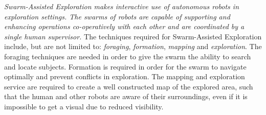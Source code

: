 
  \emph{Swarm-Assisted Exploration makes interactive use of autonomous robots in exploration settings. The swarms of robots are capable of supporting and enhancing operations co-operatively with each other and are coordinated by a single human supervisor.}\cite{Naghsh2008,Penders2011}
    The techniques required for Swarm-Assisted Exploration include, but are not limited to: \emph{foraging}, \emph{formation}, \emph{mapping} and \emph{exploration}.\cite{Naghsh2008,Penders2011} The foraging techniques are needed in order to give the swarm the ability to search and locate subjects. Formation is required in order for the swarm to navigate optimally and prevent conflicts in exploration. The mapping and exploration service are required to create a well constructed map of the explored area, such that the human and other robots are aware of their surroundings, even if it is impossible to get a visual due to reduced visibility.